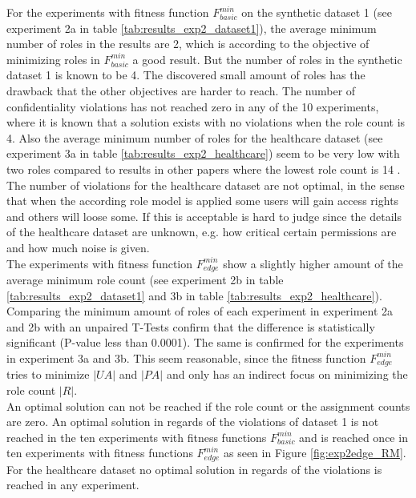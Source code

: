 For the experiments with fitness function $F_{basic}^{min}$ on the synthetic dataset 1 (see experiment 2a in table \ref{tab:results_exp2_dataset1}), the average minimum number of roles in the results are 2, which is according to the objective of minimizing roles in $F_{basic}^{min}$ a good result. But the number of roles in the synthetic dataset 1 is known to be 4. The discovered small amount of roles has the drawback that the other objectives are harder to reach. The number of confidentiality violations has not reached zero in any of the 10 experiments, where it is known that a solution exists with no violations when the role count is 4. Also the average minimum number of roles for the healthcare dataset (see experiment 3a in table \ref{tab:results_exp2_healthcare}) seem to be very low with two roles compared to results in other papers where the lowest role count is 14 \cite{Ene}\cite{Molloy:2009:ERM:1542207.1542224}. The number of violations for the healthcare dataset are not optimal, in the sense that when the according role model is applied some users will gain access rights and others will loose some. If this is acceptable is hard to judge since the details of the healthcare dataset are unknown, e.g. how critical certain permissions are and how much noise is given.\\
The experiments with fitness function $F_{edge}^{min}$ show a slightly higher amount of the average minimum role count (see experiment 2b in table \ref{tab:results_exp2_dataset1} and 3b in table \ref{tab:results_exp2_healthcare}). Comparing the minimum amount of roles of each experiment in experiment 2a and 2b with an unpaired T-Tests confirm that the difference is statistically significant (P-value less than 0.0001). The same is confirmed for the experiments in experiment 3a and 3b. This seem reasonable, since the fitness function $F_{edge}^{min}$ tries to minimize $|UA|$ and $|PA|$ and only has an indirect focus on minimizing the role count $|R|$.\\
An optimal solution can not be reached if the role count or the assignment counts are zero. An optimal solution in regards of the violations of dataset 1 is not reached in the ten experiments with fitness functions $F_{basic}^{min}$ and is reached once in ten experiments with fitness functions $F_{edge}^{min}$ as seen in Figure \ref{fig:exp2edge_RM}. For the healthcare dataset no optimal solution in regards of the violations is reached in any experiment.\\

